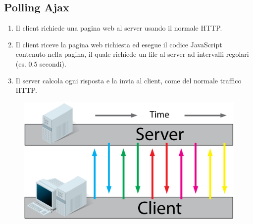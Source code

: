 \subsection{Polling Ajax}
\begin{enumerate}
	\item Il client richiede una pagina web al server usando  il normale HTTP.
	\item Il client riceve la pagina web richiesta ed esegue il codice JavaScript contenuto nella pagina, il quale richiede un file al server ad intervalli regolari (es. 0.5 secondi).
	\item Il server calcola ogni risposta e la invia al client, come del normale traffico HTTP.
\end{enumerate}
\begin{figure}[h]
	\centering
	\includegraphics[scale=0.4]{Immagini/ajax_polling.png}
\end{figure}
